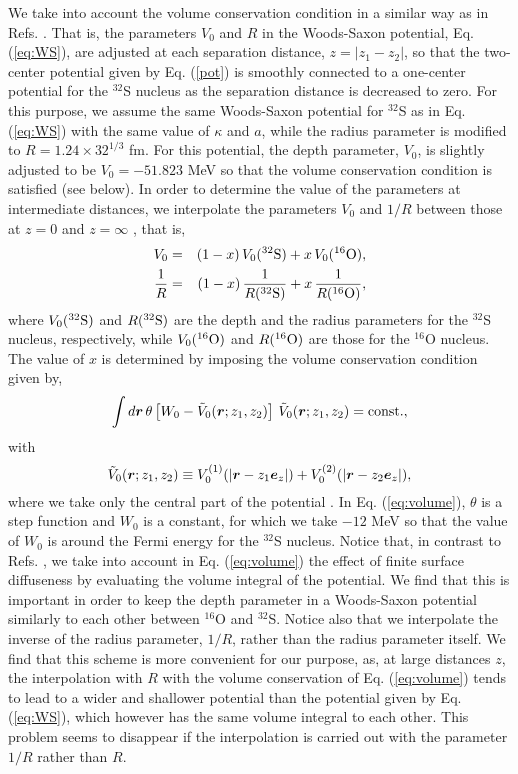 \documentclass[superscriptaddress,twocolumn,amsmath,amssymb]{revtex4}
\renewcommand{\vec}[1]{\mbox{\boldmath $#1$}}
\begin{document}
We take into account the volume conservation condition 
in a similar way as in Refs. \cite{Diaz-Torres05,NSP87}. 
That is, the parameters $V_0$ and $R$ in the Woods-Saxon potential, Eq. (\ref{eq:WS}), 
are adjusted 
at each separation distance, $z=|z_1-z_2|$,  
so that the two-center potential given by Eq. (\ref{pot}) 
is smoothly connected to a one-center potential for the 
$^{32}$S nucleus as the separation distance 
is decreased to zero. 
For this purpose, we assume 
the same Woods-Saxon potential for $^{32}$S as in Eq. (\ref{eq:WS}) with 
the same value of $\kappa$ and $a$, while the radius parameter is modified to 
$R=1.24\times 32^{1/3}$ fm. For this potential, the depth parameter, $V_0$, is slightly 
adjusted to be $V_0=-51.823$ MeV so that the volume conservation condition 
is satisfied (see below). 
In order to determine the value of the parameters at intermediate distances, 
we interpolate the parameters $V_0$ and $1/R$ between those at $z=0$ 
and $z=\infty$ \cite{Diaz-Torres05,NSP87}, that is, 
%
\begin{eqnarray}
V_0&=&(1-x)\, V_0(^{32}{\rm S}) +x \,V_0(^{16}{\rm O}), \\
\frac{1}{R}&=&(1-x)\,\frac{1}{R(^{32}{\rm S})}+x\,\frac{1}{R(^{16}{\rm O})}, 
\end{eqnarray} 
%
where $V_0(^{32}{\rm S})$ and $R(^{32}{\rm S})$ are the depth and the radius parameters for the $^{32}$S nucleus, 
respectively, while $V_0(^{16}{\rm O})$ and $R(^{16}{\rm O})$ are those for the $^{16}$O nucleus. 
The value of $x$ is determined by imposing 
the 
volume conservation condition given by, 
%
\begin{equation}
\int d\vec{r}\,\theta\left[W_0-\tilde{V}_0(\vec{r};z_1,z_2)
\right] \,\tilde{V}_0(\vec{r};z_1,z_2)= {\rm const.}, 
\label{eq:volume}
\end{equation}
%
with 
%
\begin{equation}
\tilde{V}_0(\vec{r};z_1,z_2)\equiv
V_0^{(1)}(|\vec{r}-z_1\vec{e}_z|) 
+V_0^{(2)}(|\vec{r}-z_2\vec{e}_z|),
\end{equation}
%
where we take only the central part of the potential \cite{Diaz-Torres05}. In Eq. (\ref{eq:volume}), 
$\theta$ is a step function and 
$W_0$ is a constant, 
for which we take $-12$ MeV so that the value of $W_0$ is around the Fermi energy for the $^{32}$S nucleus. 
Notice that, in contrast to Refs. \cite{Diaz-Torres05,NSP87}, we take into account 
in Eq. (\ref{eq:volume}) 
the effect of 
finite surface diffuseness by evaluating the volume integral of the 
potential.  
We find that this is important in order to 
keep the depth parameter in a Woods-Saxon potential 
similarly to each other between $^{16}$O and $^{32}$S. 
Notice also that we interpolate the inverse of the radius parameter, $1/R$, rather 
than the radius parameter 
itself. We find that this scheme is more convenient for our purpose, as, 
at large distances $z$, 
the interpolation with $R$ with the volume conservation of Eq. (\ref{eq:volume}) 
tends to lead to a 
wider and shallower potential 
than the potential given by Eq. (\ref{eq:WS}), 
which however has the same volume integral 
to each other. 
This problem seems to disappear if the interpolation is carried out with the parameter $1/R$ rather than $R$. 
\end{document}
